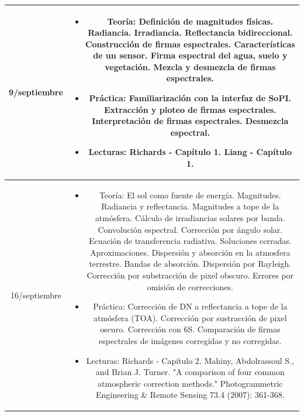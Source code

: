 \documentclass[11pt]{article}
\begin{document}
\begin{longtable}[h!]{| c | c | }
\midrule
9/septiembre & \begin{minipage}{.65\textwidth}
\begin{itemize} 
    \vspace{1mm}
  \item Teoría: Definición de magnitudes físicas. Radiancia. Irradiancia. Reflectancia bidireccional. Construcción de firmas espectrales. Características de un sensor. Firma espectral del agua, suelo y vegetación. Mezcla y desmezcla de firmas espectrales.
  \item Práctica: Familiarización con la interfaz de SoPI\@. Extracción y ploteo de firmas espectrales. Interpretación de firmas espectrales. Desmezcla espectral.
	\item Lecturas: Richards - Capítulo 1. Liang - Capítulo 1.
    \vspace{1mm}
\end{itemize}
\end{minipage} \\
\midrule
16/septiembre & \begin{minipage}{.65\textwidth}
\begin{itemize} 
    \vspace{1mm}
	\item Teoría: El sol como fuente de energía. Magnitudes. Radiancia y reflectancia. Magnitudes a tope de la atmósfera. Cálculo de irradiancias solares por banda. Convolución espectral. Corrección por ángulo solar. Ecuación de transferencia radiativa. Soluciones cerradas. Aproximaciones. Dispersión y absorción en la atmosfera terrestre. Bandas de absorción. Dispersión por Rayleigh. Corrección por substracción de pixel obscuro. Errores por omisión de correcciones.
  \item Práctica: Corrección de DN a reflectancia a tope de la atmósfera (TOA). Corrección por sustracción de pixel oscuro. Corrección con 6S. Comparación de firmas espectrales de imágenes corregidas y no corregidas.
	\item Lecturas: Richards - Capítulo 2. Mahiny, Abdolrassoul S., and Brian J.
        Turner. "A comparison of four common atmospheric correction methods."
        Photogrammetric Engineering \& Remote Sensing 73.4 (2007): 361-368.
    \vspace{1mm}
\end{itemize}
\end{minipage} \\


\end{longtable}
\end{document}
